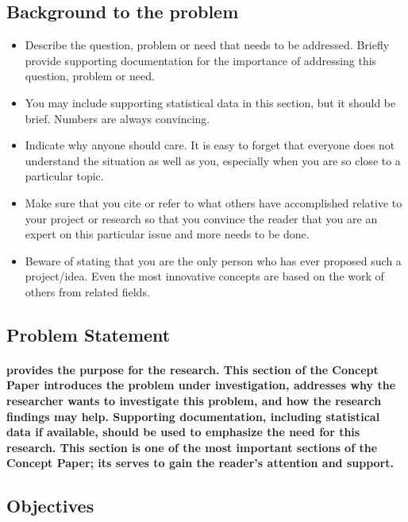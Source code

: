 \documentclass[11pt]{article}
\begin{document}
	 \subsection{\textbf{Background to the problem}}
	  \begin{itemize}
	 	
	 \item Describe the question, problem or need that needs to be addressed. Briefly provide supporting documentation for the importance of addressing this question, problem or need. 
	 \item You may include supporting statistical data in this section, but it should be brief. Numbers are always convincing. \cite{DUMMY:2}
	 \item Indicate why anyone should care. It is easy to forget that everyone does not understand the situation as well as you, especially when you are so close to a particular topic.
	 \item Make sure that you cite or refer to what others have accomplished relative to your project or research so that you convince the reader that you are an expert on this particular issue and more needs to be done. 
	\item Beware of stating that you are the only person who has ever proposed such a project/idea. Even the most innovative concepts are based on the work of others from related fields.
	 	
	 \end{itemize} 
	 
	 \subsection{\textbf{Problem Statement}}
	 
	 \paragraph{\textmd{provides the purpose for the research.  This section of the Concept Paper introduces the problem under investigation, addresses why the researcher wants to investigate this problem, and how the research findings may help.  Supporting documentation, including statistical data if available, should be used to emphasize the need for this research.  This section is one of the most important sections of the Concept Paper; its serves to gain the reader’s attention and support.}}
	 
	 \subsection{\textbf{Objectives}}
	 
\end{document}
